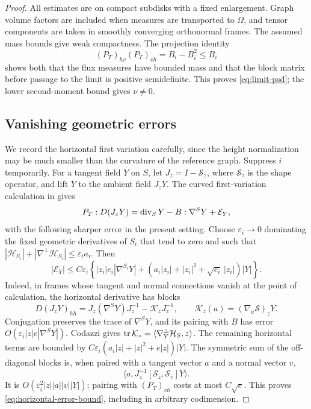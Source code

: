 \begin{proof}
All estimates are on compact subdisks with a fixed enlargement. Graph
volume factors are included when measures are transported to $\Omega$,
and tensor components are taken in smoothly converging orthonormal frames.
The assumed mass bounds give weak compactness. The projection identity
\[
 (P_T)_{hv}(P_T)_{vh}=B_i-B_i^2\le B_i
\]
shows both that the flux measures have bounded mass and that the block
matrix before passage to the limit is positive semidefinite. This proves
\eqref{eq:limit-psd}; the lower second-moment bound gives $\nu\ne0$.

\subsection*{Vanishing geometric errors}

We record the horizontal first variation carefully, since the height
normalization may be much smaller than the curvature of the reference
graph. Suppress $i$ temporarily. For a tangent field $Y$ on $S$, let
$J_z=I-\mathcal S_z$, where $\mathcal S_z$ is the shape operator, and
lift $Y$ to the ambient field $J_zY$. The curved first-variation calculation
in \cite[Lemma~2.2]{AE} gives
\begin{equation}\label{eq:horizontal-error}
 P_T:D(J_zY)=\operatorname{div}_S Y-B:\nabla^S Y+\mathcal E_Y,
\end{equation}
with the following sharper error in the present setting. Choose
$\varepsilon_i\to0$ dominating the fixed geometric derivatives of $S_i$
that tend to zero and such that
$|\mathcal H_{S_i}|+|\nabla^\perp\mathcal H_{S_i}|\le\varepsilon_i a_i$.
Then
\begin{equation}\label{eq:horizontal-error-bound}
 |\mathcal E_Y|\le C\varepsilon_i\left\{
 |z_i|e_i|\nabla^{S_i}Y|
 +(a_i|z_i|+|z_i|^2+\sqrt{e_i}\,|z_i|)|Y|\right\}.
\end{equation}
Indeed, in frames whose tangent and normal connections vanish at the
point of calculation, the horizontal derivative has blocks
\[
 D(J_zY)_{hh}=J_z(\nabla^SY)J_z^{-1}-\mathcal K_zJ_z^{-1},
 \qquad \mathcal K_z(a)=(\nabla_a\mathcal S)_zY.
\]
Conjugation preserves the trace of $\nabla^SY$, and its pairing with $B$
has error $O(\varepsilon_i|z|e|\nabla^SY|)$. Codazzi gives
$\operatorname{tr}\mathcal K_z=\langle\nabla_Y^\perp\mathcal H_S,z\rangle$.
The remaining horizontal terms are bounded by
$C\varepsilon_i(a_i|z|+|z|^2+e|z|)|Y|$.
The symmetric sum of the off-diagonal blocks is, when paired with a
tangent vector $a$ and a normal vector $v$,
\[
 \big\langle a,J_z^{-1}[\mathcal S_z,\mathcal S_v]Y\big\rangle.
\]
It is $O(\varepsilon_i^2|z||a||v||Y|)$; pairing with $(P_T)_{vh}$
costs at most $C\sqrt e$. This proves
\eqref{eq:horizontal-error-bound}, including in arbitrary codimension.


\end{proof}
